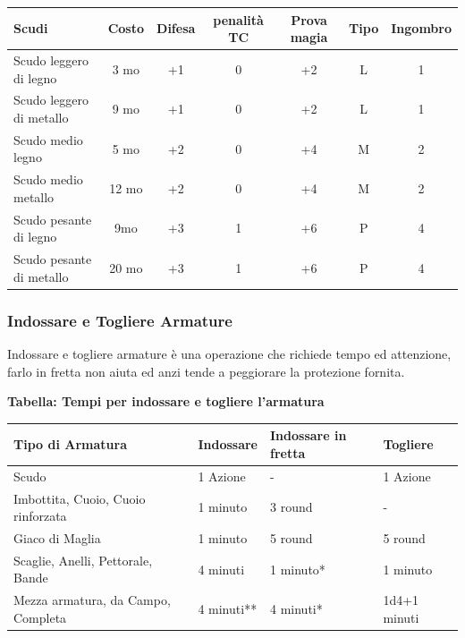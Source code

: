 \label{tabella-scudi}

\noindent\begin{tabular}{lcccccc}
	\toprule
\rowcolor{gray!20}\textbf{Scudi} & \textbf{Costo} & \textbf{Difesa} & \textbf{penalità TC} & \textbf{Prova magia} & \textbf{Tipo} & \textbf{Ingombro}\\
\toprule
Scudo leggero di legno& 3 mo&+1& 0& +2& L & 1\\
\rowcolor{gray!20}Scudo leggero di metallo & 9 mo&+1& 0& +2& L& 1\\
Scudo medio legno &5 mo &+2& 0& +4& M& 2\\
\rowcolor{gray!20}Scudo medio metallo&12 mo&+2& 0& +4& M& 2\\
Scudo pesante di legno & 9mo&+3 & 1& +6& P& 4\\
\rowcolor{gray!20}Scudo pesante di metallo & 20 mo&+3& 1& +6& P& 4\\
\end{tabular}

\begin{multicols}{2}

\subsubsection{Indossare e Togliere Armature}

Indossare e togliere armature è una operazione che richiede tempo ed attenzione, farlo in fretta non aiuta ed anzi tende a peggiorare la protezione fornita.

\end{multicols}

\textbf{Tabella: Tempi per indossare e togliere l'armatura}

\medskip

\noindent\begin{tabularx}{\linewidth}{Xlll}
	\toprule
\rowcolor{gray!20}\textbf{Tipo di Armatura}& \textbf{Indossare} & \textbf{Indossare in fretta} & \textbf{Togliere}\\
\toprule
Scudo& 1 Azione & - & 1 Azione\\
\rowcolor{gray!20}Imbottita, Cuoio, Cuoio rinforzata& 1 minuto& 3 round& - \\
Giaco di Maglia& 1 minuto& 5 round& 5 round\\
\rowcolor{gray!20}Scaglie, Anelli, Pettorale, Bande & 4 minuti & 1 minuto{*}& 1 minuto\\
Mezza armatura, da Campo, Completa& 4 minuti{*}{*}& 4 minuti{*}& 1d4+1 minuti
\end{tabularx}

